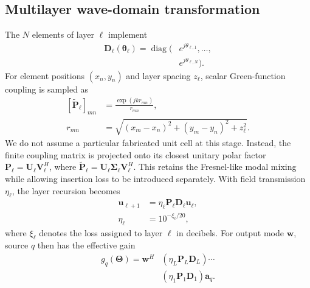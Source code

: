 \documentclass[pdflatex,sn-nature]{sn-jnl}
\newcommand{\vect}[1]{\bm{#1}}
\begin{document}
\subsection{Multilayer wave-domain transformation}
The $N$ elements of layer $\ell$ implement
\begin{equation}
\begin{aligned}
\vect D_\ell(\vect\theta_\ell)
=\operatorname{diag}\!\big(&e^{j\theta_{\ell,1}},\ldots,\\
&e^{j\theta_{\ell,N}}\big).
\end{aligned}
\end{equation}
For element positions $(x_n,y_n)$ and layer spacing $z_\ell$, scalar Green-function
coupling is sampled as
\begin{equation}
\begin{aligned}
[\widetilde{\vect P}_\ell]_{mn}
&=\frac{\exp(jkr_{mn})}{r_{mn}},\\
r_{mn}&=\sqrt{(x_m-x_n)^2+(y_m-y_n)^2+z_\ell^2}.
\end{aligned}
\label{eq:green}
\end{equation}
We do not assume a particular fabricated unit cell at this stage. Instead, the finite
coupling matrix is projected onto its closest unitary polar factor
$\vect P_\ell=\vect U_\ell\vect V_\ell^H$, where
$\widetilde{\vect P}_\ell=\vect U_\ell\vect\Sigma_\ell\vect V_\ell^H$. This retains
the Fresnel-like modal mixing while allowing insertion loss to be introduced
separately. With field transmission $\eta_\ell$, the layer recursion becomes
\begin{equation}
\begin{aligned}
\vect u_{\ell+1}&=\eta_\ell\vect P_\ell\vect D_\ell\vect u_\ell,\\
\eta_\ell&=10^{-\xi_\ell/20},
\end{aligned}
\label{eq:forward}
\end{equation}
where $\xi_\ell$ denotes the loss assigned to layer $\ell$ in decibels. For output
mode $\vect w$, source $q$ then has the effective gain
\begin{equation}
\begin{aligned}
g_q(\vect\Theta)=\vect w^H
&\left(\eta_L\vect P_L\vect D_L\right)\cdots\\
&\left(\eta_1\vect P_1\vect D_1\right)\vect a_q.
\end{aligned}
\label{eq:gain}
\end{equation}
\end{document}
